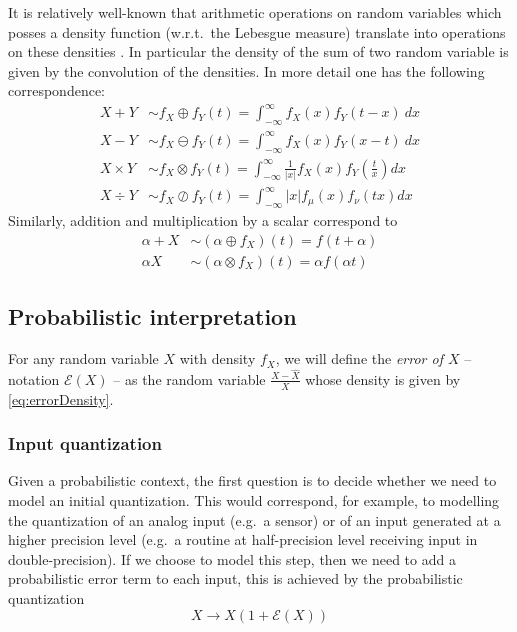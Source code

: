\documentclass[10pt,conference]{IEEEtran}
\newcommand{\eg}{e.g.\ }
\newcommand{\wrt}{w.r.t.\ }
\newcommand{\Err}{\mathcal{E}}
\newcommand{\absv}[1]{\vert #1\vert}
\begin{document}
It is relatively well-known that arithmetic operations on random variables which posses a density function (\wrt the Lebesgue measure) translate into operations on these densities \cite{springer1979algebra}. In particular the density of the sum of two random variable is given by the convolution of the densities. In more detail one has the following correspondence:
\begin{align}
X+Y&\sim f_X\oplus f_Y(t)=\int_{-\infty}^{\infty} f_X(x)f_Y(t-x)~dx\label{eq:pdfplus}\\
X-Y&\sim f_X\ominus f_Y(t)=\int_{-\infty}^{\infty} f_X(x)f_Y(x-t)~dx\label{eq:pdfminus}\\
X\times Y&\sim f_X\otimes f_Y(t)=\int_{-\infty}^{\infty} \frac{1}{\absv{x}}f_X(x)f_Y\left(\frac{t}{x}\right)dx\label{eq:pdftimes}\\
X\div Y&\sim f_X\oslash f_Y(t)=\int_{-\infty}^{\infty} \absv{x}f_\mu(x)f_\nu(tx)dx\label{eq:pdfdiv}
\end{align}
Similarly, addition and multiplication by a scalar correspond to
\begin{align*}
\alpha+X&\sim (\alpha\oplus f_X)(t)=f(t+\alpha)\\
\alpha X&\sim (\alpha\otimes f_X)(t)=\alpha f(\alpha t)
\end{align*}

\subsection{Probabilistic interpretation}

For any random variable $X$ with density $f_X$, we will define the \emph{error of $X$} -- notation $\Err(X)$ -- as the random variable $\frac{X-\widehat{X}}{X}$ whose density is given by \cref{eq:errorDensity}.

\subsubsection{Input quantization} Given a probabilistic context, the first question is to decide whether we need to model an initial quantization. This would correspond, for example, to modelling the quantization of an analog input (\eg a sensor) or of an input generated at a higher precision level (\eg a routine at half-precision level receiving input in double-precision). If we choose to model this step, then we need to add a probabilistic error term to each input, this is achieved by the probabilistic quantization
\[
X\longrightarrow X(1+\Err(X))
\] 
\end{document}
